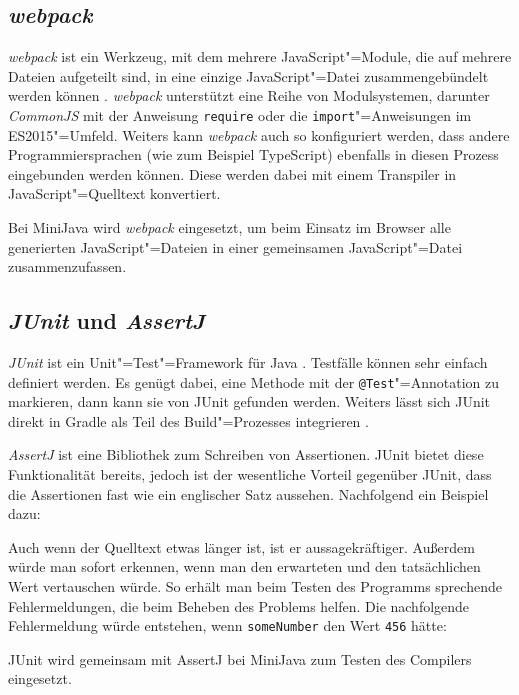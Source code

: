 \subsection{\emph{webpack}}
\emph{webpack} ist ein Werkzeug, mit dem mehrere JavaScript"=Module, die auf mehrere Dateien aufgeteilt sind, in eine einzige JavaScript"=Datei zusammengebündelt werden können \cite{Webpack}. \emph{webpack} unterstützt eine Reihe von Modulsystemen, darunter \emph{CommonJS} mit der Anweisung \lstinline{require} oder die \lstinline{import}"=Anweisungen im ES2015"=Umfeld. Weiters kann \emph{webpack} auch so konfiguriert werden, dass andere Programmiersprachen (wie zum Beispiel TypeScript) ebenfalls in diesen Prozess eingebunden werden können. Diese werden dabei mit einem Transpiler in JavaScript"=Quelltext konvertiert.

Bei MiniJava wird \emph{webpack} eingesetzt, um beim Einsatz im Browser alle generierten JavaScript"=Dateien in einer gemeinsamen JavaScript"=Datei zusammenzufassen.

\subsection{\emph{JUnit} und \emph{AssertJ}}
\emph{JUnit} ist ein Unit"=Test"=Framework für Java \cite{JUnit}. Testfälle können sehr einfach definiert werden. Es genügt dabei, eine Methode mit der \lstinline{@Test}"=Annotation zu markieren, dann kann sie von JUnit gefunden werden. Weiters lässt sich JUnit direkt in Gradle als Teil des Build"=Prozesses integrieren \cite{Gradle}.

\emph{AssertJ} ist eine Bibliothek zum Schreiben von Assertionen. JUnit bietet diese Funktionalität bereits, jedoch ist der wesentliche Vorteil gegenüber JUnit, dass die Assertionen fast wie ein englischer Satz aussehen. Nachfolgend ein Beispiel dazu:



Auch wenn der Quelltext etwas länger ist, ist er aussagekräftiger. Außerdem würde man sofort erkennen, wenn man den erwarteten und den tatsächlichen Wert vertauschen würde. So erhält man beim Testen des Programms sprechende Fehlermeldungen, die beim Beheben des Problems helfen. Die nachfolgende Fehlermeldung würde entstehen, wenn \lstinline{someNumber} den Wert \lstinline{456} hätte:



JUnit wird gemeinsam mit AssertJ bei MiniJava zum Testen des Compilers eingesetzt.

